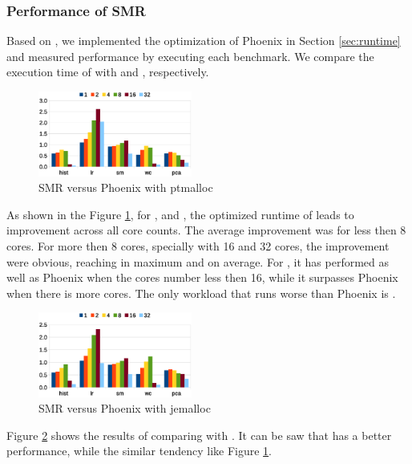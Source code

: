 \subsubsection{Performance of SMR}
Based on \myth, we implemented the optimization of Phoenix in Section \ref{sec:runtime} and measured \myds performance by executing each benchmark. 
We compare the execution time of \myds with  and , respectively.
\begin{figure}[!h!t]  
	\centering
	\includegraphics[width=0.45\textwidth]{eps/dmr_time_array.eps}
	\caption{SMR versus Phoenix with ptmalloc}
	\label{fig:smr:time:ptmalloc}
\end{figure}


As shown in the Figure \ref{fig:smr:time:ptmalloc}, for ,  and , the optimized runtime of \myds leads to improvement across all core counts.
The average improvement was  for less then 8 cores.
For more then 8 cores, specially with 16 and 32 cores, the improvement were obvious, reaching  in maximum and  on average.
For , it has performed as well as Phoenix when the cores number less then 16, while it surpasses Phoenix when there is more cores.
The only workload that \myds runs worse than Phoenix is .
\begin{figure}[!h!t]  
	\centering
	\includegraphics[width=0.45\textwidth]{eps/dmr_time_jemalloc.eps}
	\caption{SMR versus Phoenix with jemalloc}
	\label{fig:smr:time:jemalloc}
\end{figure}
Figure \ref{fig:smr:time:jemalloc} shows the results of \myds comparing with . 
It can be saw that  has a better performance, while the similar tendency like Figure \ref{fig:smr:time:ptmalloc}.


